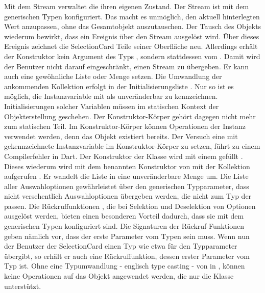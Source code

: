 Mit dem Stream  verwaltet die  ihren eigenen Zustand.
Der Stream ist mit dem generischen Typen  konfiguriert.
Das macht es unmöglich, den aktuell hinterlegten Wert anzupassen, ohne das Gesamtobjekt auszutauschen.
Der Tausch des Objekts wiederum bewirkt, dass ein Ereignis über den Stream ausgelöst wird. Über dieses Ereignis zeichnet die SelectionCard Teile seiner Oberfläche neu. Allerdings erhält der Konstruktor kein Argument des Typs , sondern stattdessen vom  . Damit wird der Benutzer nicht darauf eingeschränkt, einen Stream zu übergeben. Er kann auch eine gewöhnliche Liste oder Menge setzen. Die Umwandlung der ankommenden Kollektion erfolgt in der Initialisierungsliste . Nur so ist es möglich, die Instanzvariable mit  als unveränderbar zu kennzeichnen. Initialisierungen solcher Variablen müssen im statischen Kontext der Objekterstellung geschehen. Der Konstruktor-Körper gehört dagegen nicht mehr zum statischen Teil. Im Konstruktor-Körper können Operationen der Instanz verwendet werden, denn das Objekt existiert bereits. Der Versuch eine mit  gekennzeichnete Instanzvariable im Konstruktor-Körper zu setzen, führt zu einem Compilerfehler in Dart. Der Konstruktor  der Klasse  wird mit einem  gefüllt . Dieses wiederum wird mit dem benannten Konstruktor  von  mit der Kollektion aufgerufen . Er wandelt die  Liste in eine unveränderbare Menge um. Die Liste aller Auswahloptionen   gewährleistet über den generischen Typparameter, dass nicht versehentlich Auswahloptionen übergeben werden, die nicht zum Typ der  passen. Die Rückruffunktionen , die bei Selektion und Deselektion von Optionen ausgelöst werden, bieten einen besonderen Vorteil dadurch, dass sie mit dem generischen Typen konfiguriert sind. Die Signaturen der Rückruf-Funktionen  geben nämlich vor, dass der erste Parameter vom Typen  sein muss. Wenn nun der Benutzer der SelectionCard einen Typ wie etwa  für den Typparameter übergibt, so erhält er auch eine Rückruffunktion, dessen erster Parameter vom Typ  ist. Ohne eine Typumwandlung - englisch type casting - von  in , können keine Operationen auf das Objekt angewendet werden, die nur die Klasse  unterstützt.

